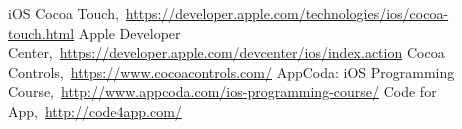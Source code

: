 \begin{thebibliography}{99}

iOS Cocoa Touch,\ \url{https://developer.apple.com/technologies/ios/cocoa-touch.html}
Apple Developer Center,\ \url{https://developer.apple.com/devcenter/ios/index.action}
Cocoa Controls,\ \url{https://www.cocoacontrols.com/}
AppCoda: iOS Programming Course,\ \url{http://www.appcoda.com/ios-programming-course/}
Code for App,\ \url{http://code4app.com/}

\end{thebibliography}

